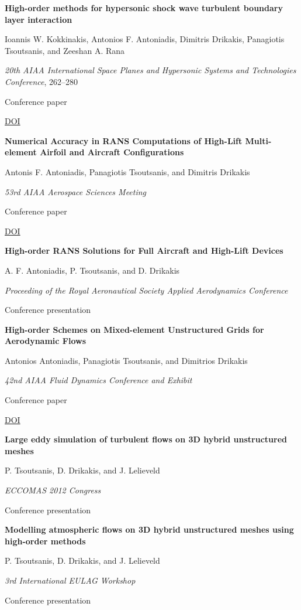 \documentclass[11pt,a4paper]{article}
\newlength{\cventrysep}
\newenvironment{cventry}{%
  \par\noindent\begin{minipage}{\linewidth}
  \RaggedRight\fontsize{9.8}{12.5}\selectfont
}{\end{minipage}\par\addvspace{\cventrysep}}
\newcommand{\cvtitle}[1]{{\bfseries #1\par}\vspace{1pt}}
\newcommand{\cvdetail}[1]{{#1\par}\vspace{1pt}}
\newcommand{\cvmeta}[1]{{\fontsize{9}{11.5}\selectfont\color{Muted}#1\par}\vspace{1pt}}
\newcommand{\cvlinks}[1]{{\fontsize{9}{11.5}\selectfont #1\par}}
\newcommand{\cvyear}[1]{{\color{Teal}\bfseries\fontsize{11}{13}\selectfont #1\par}\vspace{6pt}}
\begin{document}
\begin{cventry}
\cvtitle{High-order methods for hypersonic shock wave turbulent boundary layer interaction}
\cvdetail{Ioannis W. Kokkinakis, Antonios F. Antoniadis, Dimitris Drikakis, Panagiotis Tsoutsanis, and Zeeshan A. Rana}
\cvmeta{\textit{20th AIAA International Space Planes and Hypersonic Systems and Technologies Conference}, 262--280\par Conference paper}
\cvlinks{\href{https://doi.org/10.2514/6.2015-3524}{DOI}}
\end{cventry}

\begin{cventry}
\cvtitle{Numerical Accuracy in RANS Computations of High-Lift Multi-element Airfoil and Aircraft Configurations}
\cvdetail{Antonis F. Antoniadis, Panagiotis Tsoutsanis, and Dimitris Drikakis}
\cvmeta{\textit{53rd AIAA Aerospace Sciences Meeting}\par Conference paper}
\cvlinks{\href{https://doi.org/10.2514/6.2015-0317}{DOI}}
\end{cventry}

\begin{cventry}
\cvyear{2014}
\cvtitle{High-order RANS Solutions for Full Aircraft and High-Lift Devices}
\cvdetail{A. F. Antoniadis, P. Tsoutsanis, and D. Drikakis}
\cvmeta{\textit{Proceeding of the Royal Aeronautical Society Applied Aerodynamics Conference}\par Conference presentation}
\end{cventry}

\begin{cventry}
\cvyear{2012}
\cvtitle{High-order Schemes on Mixed-element Unstructured Grids for Aerodynamic Flows}
\cvdetail{Antonios Antoniadis, Panagiotis Tsoutsanis, and Dimitrios Drikakis}
\cvmeta{\textit{42nd AIAA Fluid Dynamics Conference and Exhibit}\par Conference paper}
\cvlinks{\href{https://doi.org/10.2514/6.2012-2833}{DOI}}
\end{cventry}

\begin{cventry}
\cvtitle{Large eddy simulation of turbulent flows on 3D hybrid unstructured meshes}
\cvdetail{P. Tsoutsanis, D. Drikakis, and J. Lelieveld}
\cvmeta{\textit{ECCOMAS 2012 Congress}\par Conference presentation}
\end{cventry}

\begin{cventry}
\cvtitle{Modelling atmospheric flows on 3D hybrid unstructured meshes using high-order methods}
\cvdetail{P. Tsoutsanis, D. Drikakis, and J. Lelieveld}
\cvmeta{\textit{3rd International EULAG Workshop}\par Conference presentation}
\end{cventry}
\end{document}
